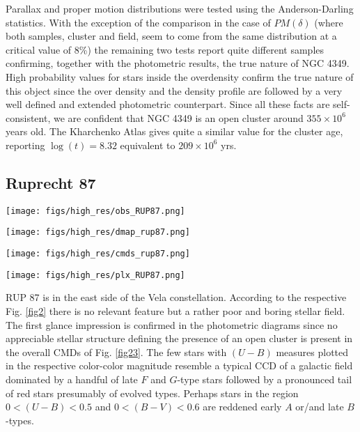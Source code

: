 \documentclass{aa}
\begin{document}
Parallax and proper motion distributions were tested using the Anderson-Darling
statistics. With the exception of the comparison in the case of $PM(\delta)$
(where both samples, cluster and field, seem to come from the same distribution
at a critical value of 8\%) the remaining two tests report quite different
samples confirming, together with the photometric results, the true nature of
NGC 4349.\\

High probability values for stars inside the overdensity confirm the
true nature of this object since the over density and the density profile
are followed by a very well defined and extended photometric counterpart.
Since all these facts are self-consistent, we are confident that NGC 4349 is
an open cluster around $355\times10^6$ years old.
The Kharchenko Atlas gives quite a similar value for the cluster age, reporting
$\log(t)=8.32$ equivalent to $209\times10^6$ yrs.



\subsection{Ruprecht 87}

\begin{figure*}[ht]
    \centering
    \texttt{[image: figs/high\_res/obs\_RUP87.png]}
    \caption{Idem Fig. \ref{fig3} for RUP 87.}
    \label{fig23}
\end{figure*}
\begin{figure*}[ht]
    \centering
    \texttt{[image: figs/high\_res/dmap\_rup87.png]}
    \caption{Idem Fig. \ref{fig4} for RUP 87.}
    \label{fig24}
\end{figure*}
\begin{figure*}[ht]
    \centering
    \texttt{[image: figs/high\_res/cmds\_rup87.png]}
    \caption{Idem Fig. \ref{fig5} for RUP 87.}
    \label{fig25}
\end{figure*}
\begin{figure*}[ht]
    \centering
    \texttt{[image: figs/high\_res/plx\_RUP87.png]}
    \caption{Idem Fig. \ref{fig6} for RUP 87.}
    \label{fig26}
\end{figure*}

RUP 87 is in the east side of the Vela constellation. According to the
respective Fig. \ref{fig2} there is no relevant feature but a rather poor and
boring stellar field. The first glance impression is confirmed in the
photometric diagrams since no appreciable stellar structure
defining the presence of an open cluster is present in the overall CMDs of Fig.
\ref{fig23}. The few stars with $(U-B)$ measures plotted in the respective
color-color magnitude resemble a typical CCD of a galactic field dominated by a
handful of late $F$ and $G$-type stars followed by a pronounced tail of red
stars presumably of evolved types. Perhaps stars in the region $0<(U-B)<0.5$
and $0<(B-V)<0.6$ are reddened early $A$ or/and late $B$-types.\\
\end{document}
